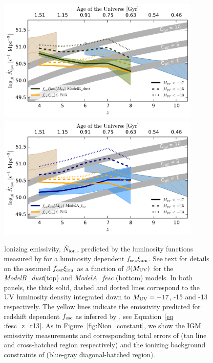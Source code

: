 \begin{figure}
\centering
  \includegraphics[width=0.9\textwidth]{plots/Fig10a.pdf}
  \includegraphics[width=0.9\textwidth]{plots/Fig10b.pdf}
  \caption[Ionizing emissivity, $\dot{N}_{\rm{ion}}$, predicted by the luminosity functions measured by \citet{Bouwens:2014tx} for a luminosity dependent $f_{\rm{esc}}\xi_{\rm{ion}}$.]{Ionizing emissivity, $\dot{N}_{\rm{ion}}$, predicted by the luminosity functions measured by \citet{Bouwens:2014tx} for a luminosity dependent $f_{\rm{esc}}\xi_{\rm{ion}}$. See text for details on the assumed $f_{\rm{esc}}\xi_{\rm{ion}}$ as a function of $\beta(M_{\rm{UV}})$ for the \emph{ModelB\_dust}(top) and \emph{ModelA\_fesc} (bottom) models. In both panels, the thick solid, dashed and dotted lines correspond to the UV luminosity density integrated down to $M_{\rm{UV}} = -17$, -15 and -13 respectively. The yellow lines indicate the emissivity predicted for redshift dependent $f_{\rm{esc}}$ as inferred by \citet{Robertson:2013ji}, see Equation~\ref{eq	:fesc_z_r13}. As in Figure~\ref{fig:Nion_constant}, we show the IGM emissivity measurements and corresponding total errors of \citet{Becker:2013hc} (tan line and cross-hatched region respectively) and the ionizing background constraints of \citet{Bouwens:2015tm} (blue-gray diagonal-hatched region).}
  \label{fig:Nion_xi_kappa_zMuv}
\end{figure}

